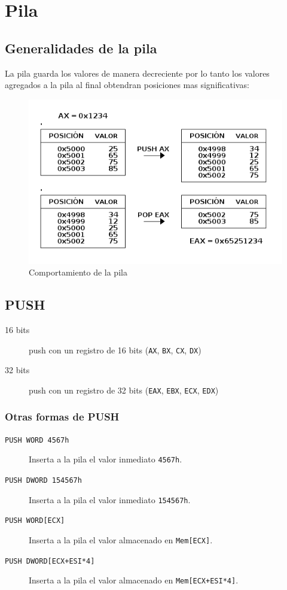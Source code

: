 \documentclass[12pt]{article}
\begin{document}
\pagebreak

\section*{Pila}
\label{sec:org9867318}
\subsection*{Generalidades de la pila}
\label{sec:org3f49e45}
La pila guarda los valores de manera decreciente por lo tanto los valores agregados a la pila al final obtendran posiciones mas significativas:

\begin{figure}[htbp]
\centering
\includegraphics[width=14cm]{img/pila.png}
\caption{Comportamiento de la pila}
\end{figure}


\subsection*{PUSH}
\label{sec:orgf703ee4}
\begin{description}
\item[{16 bits}] push con un registro de 16 bits (\texttt{AX}, \texttt{BX}, \texttt{CX}, \texttt{DX})
\item[{32 bits}] push con un registro de 32 bits (\texttt{EAX}, \texttt{EBX}, \texttt{ECX}, \texttt{EDX})
\end{description}

\subsubsection*{Otras formas de PUSH}
\label{sec:org963eecc}
\begin{description}
\item[{\texttt{PUSH WORD 4567h}}] Inserta a la pila el valor inmediato \texttt{4567h}.
\item[{\texttt{PUSH DWORD 154567h}}] Inserta a la pila el valor inmediato \texttt{154567h}.
\item[{\texttt{PUSH WORD[ECX]}}] Inserta a la pila el valor almacenado en \texttt{Mem[ECX]}.
\item[{\texttt{PUSH DWORD[ECX+ESI*4]}}] Inserta a la pila el valor almacenado en \texttt{Mem[ECX+ESI*4]}.
\end{description}
\end{document}
